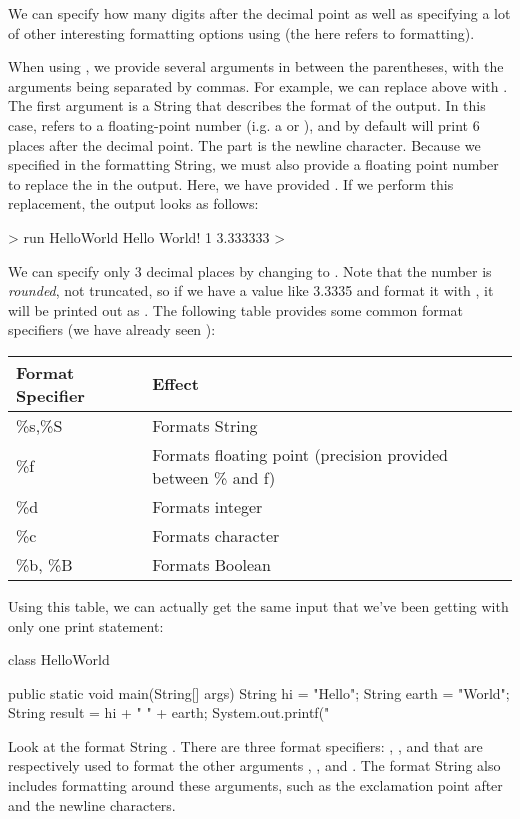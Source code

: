 We can specify how many digits after the decimal point as well
as specifying a lot of other interesting formatting options
using  (the  here refers to formatting).

When using , we provide several arguments
in between the parentheses, with the arguments being separated by
commas.
For example, we can replace  above
with .
The first argument  is a String that describes the format of the output.
In this case,  refers to a floating-point number (i.g. a  or ),
and by default will print 6 places after the decimal point.
The  part is the newline character.
Because we specified  in the formatting String, we must also provide
a floating point number to replace the  in the output. Here,
we have provided .
If we perform this replacement, the output looks as follows:
\begin{code}
> run HelloWorld
Hello World!
1
3.333333
> 
\end{code}

We can specify only 3 decimal places by changing  to .
Note that the number is \emph{rounded}, not truncated, so if we have a value like
3.3335 and format it with , it will be printed out as .
The following table provides some common format specifiers (we have already seen
):

\begin{tabular}{|l|l|}
\hline
Format Specifier & Effect\\
\hline
\%s,\%S & Formats String\\
\%f & Formats floating point (precision provided between \% and f)\\
\%d & Formats integer\\
\%c & Formats character\\
\%b, \%B & Formats Boolean\\
\hline
\end{tabular}

Using this table, we can actually get the same input that we've been getting
with only one print statement:
\begin{code}
class HelloWorld {

    public static void main(String[] args) {
        String hi = "Hello";
        String earth = "World";
        String result = hi + " " + earth;
        System.out.printf("%
    }

}
\end{code}
Look at the format String . There are three format
specifiers: , , and  that are respectively
used to format the other arguments , , and .
The format String also includes formatting around these arguments, such
as the exclamation point after  and the newline characters.
 
